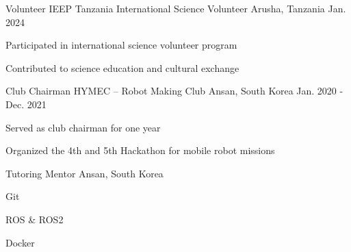 

\begin{cventries}

\cventry
{Volunteer} %
{IEEP Tanzania International Science Volunteer} %
{Arusha, Tanzania} %
{Jan. 2024} %
{
  \begin{cvitems} %
    \item {Participated in international science volunteer program}
    \item {Contributed to science education and cultural exchange}
  \end{cvitems}
}

  \cventry
    {Club Chairman} %
    {HYMEC – Robot Making Club} %
    {Ansan, South Korea} %
    {Jan. 2020 - Dec. 2021} %
    {
      \begin{cvitems} %
        \item {Served as club chairman for one year}
        \item {Organized the 4th and 5th Hackathon for mobile robot missions}
      \end{cvitems}
    }

  \cventrycompact
    {} %
    {Tutoring Mentor} %
    {Ansan, South Korea} %
    {} %
    {
      \begin{cvitems} %
        \item {Git}
        \item {ROS \& ROS2}
        \item {Docker}
      \end{cvitems}
    }

\end{cventries}

